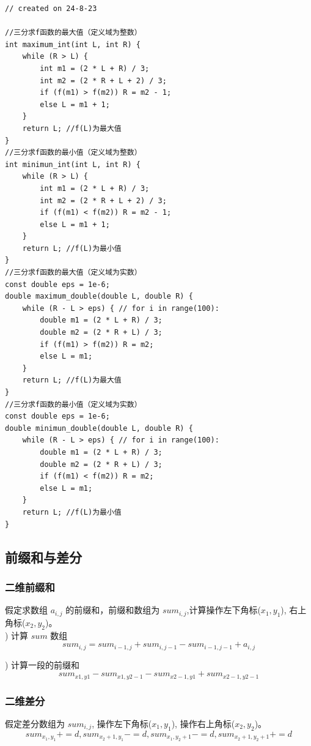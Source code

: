 \documentclass[a4paper,12pt]{article}
\begin{document}
\begin{lstlisting}
// created on 24-8-23

//三分求f函数的最大值（定义域为整数）
int maximum_int(int L, int R) { 
    while (R > L) {
        int m1 = (2 * L + R) / 3;
        int m2 = (2 * R + L + 2) / 3;
        if (f(m1) > f(m2)) R = m2 - 1;
        else L = m1 + 1;
    }
    return L; //f(L)为最大值
}
//三分求f函数的最小值（定义域为整数）
int minimun_int(int L, int R) {
    while (R > L) {
        int m1 = (2 * L + R) / 3;
        int m2 = (2 * R + L + 2) / 3;
        if (f(m1) < f(m2)) R = m2 - 1;
        else L = m1 + 1;
    }
    return L; //f(L)为最小值
}
//三分求f函数的最大值（定义域为实数）
const double eps = 1e-6;
double maximum_double(double L, double R) {
    while (R - L > eps) { // for i in range(100):
        double m1 = (2 * L + R) / 3;
        double m2 = (2 * R + L) / 3;
        if (f(m1) > f(m2)) R = m2;
        else L = m1;
    }
    return L; //f(L)为最大值
}
//三分求f函数的最小值（定义域为实数）
const double eps = 1e-6;
double minimun_double(double L, double R) {
    while (R - L > eps) { // for i in range(100):
        double m1 = (2 * L + R) / 3;
        double m2 = (2 * R + L) / 3;
        if (f(m1) < f(m2)) R = m2;
        else L = m1;
    }
    return L; //f(L)为最小值
}
\end{lstlisting}

\subsection{前缀和与差分}

\subsubsection{二维前缀和}
\noindent 假定求数组 $a_{i,j}$ 的前缀和，前缀和数组为 $sum_{i,j}$,计算操作左下角标($x_1,y_1$), 右上角标($x_2,y_2$)。\\

) 计算 $sum$ 数组
$$sum_{i,j} = sum_{i-1,j} + sum_{i,j-1} - sum_{i-1,j-1} + a_{i,j}$$

) 计算一段的前缀和
$$sum_{x1,y1}-sum_{x1,y2-1}-sum_{x2-1,y1}+sum_{x2-1,y2-1}$$

\subsubsection{二维差分}
\noindent 假定差分数组为 $sum_{i,j}$, 操作左下角标($x_1,y_1$), 操作右上角标($x_2,y_2$)。 \\
$$sum_{x_1,y_1} += d, sum_{x_2+1,y_1} -= d, sum_{x_1,y_2+1} -= d, sum_{x_2+1,y_2+1} += d$$
\end{document}
